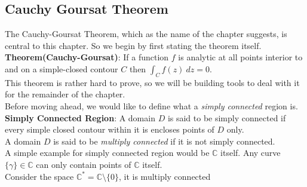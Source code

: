 \documentclass{article}
\begin{document}
\begin{flushleft}
\section{Cauchy Goursat Theorem}
The Cauchy-Goursat Theorem, which as the name of the chapter suggests, is central to this chapter. So we begin by first stating the theorem itself. \\
\textbf{Theorem(Cauchy-Goursat)}: If a function $f$ is analytic at all points interior to and on a simple-closed contour $C$ then
	$\int_{{C}}^{{}} {f\left( z \right) } \: d{z} {} = 0$. \\
This theorem is rather hard to prove, so we will be building tools to deal with it for the remainder of the chapter.\\
Before moving ahead, we would like to define what a \emph{simply connected} region is.\\
\vspace{3mm}
\textbf{Simply Connected Region}: A domain $D$ is said to be simply connected if every simple closed contour within it is encloses points of $D$ only. \\
A domain $D$ is said to be \emph{multiply connected} if it is not simply connected. \\
A simple example for simply connected region would be $\mathds{C}$ itself. Any curve $\{\gamma\} \in \mathds{C}$ can only contain points of $\mathds{C}$ itself. \\
Consider the space $\mathds{C}^* = \mathds{C} \setminus \{0\} $, it is multiply connected 

\begin{center}
		 


\end{center}
\end{flushleft}
\end{document}
